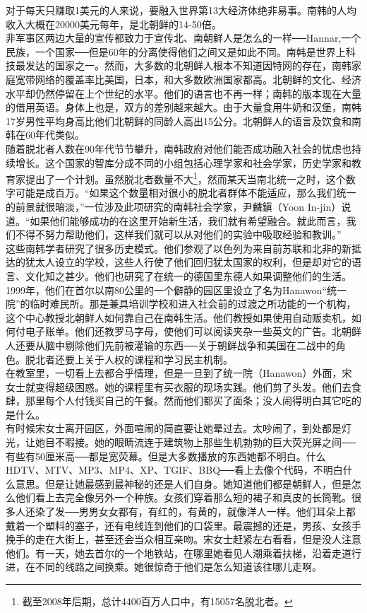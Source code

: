 对于每天只赚取1美元的人来说，要融入世界第13大经济体绝非易事。南韩的人均收入大概在20000美元每年，是北朝鲜的14-50倍。\\

非军事区两边大量的宣传都致力于宣传北、南朝鲜人是怎么的一样──Hannar,一个民族，一个国家──但是60年的分离使得他们之间又是如此不同。南韩是世界上科技最发达的国家之一。然而，大多数的北朝鲜人根本不知道因特网的存在，南韩家庭宽带网络的覆盖率比美国，日本，和大多数欧洲国家都高。北朝鲜的文化、经济水平却仍然停留在上个世纪的水平。他们的语言也不再一样；南韩的版本现在大量的借用英语。身体上也是，双方的差别越来越大。由于大量食用牛奶和汉堡，南韩17岁男性平均身高比他们北朝鲜的同龄人高出15公分。北朝鲜人的语言及饮食和南韩在60年代类似。\\

随着脱北者人数在90年代节节攀升，南韩政府对他们能否成功融入社会的忧虑也持续增长。这个国家的智库分成不同的小组包括心理学家和社会学家，历史学家和教育家提出了一个计划。虽然脱北者数量不大\footnote{截至2008年后期，总计4400百万人口中，有15057名脱北者。}，然而某天当南北统一之时，这个数字可能是成百万。“如果这个数量相对很小的脱北者群体不能适应，那么我们统一的前景就很暗淡，”一位涉及此项研究的南韩社会学家，尹麟鎭（Yoon In-jin）说道。“如果他们能够成功的在这里开始新生活，我们就有希望融合。就此而言，我们不得不努力帮助他们，这样我们就可以从对他们的实验中吸取经验和教训。”\\

这些南韩学者研究了很多历史模式。他们参观了以色列为来自前苏联和北非的新抵达的犹太人设立的学校，这些人行使了他们回归犹太国家的权利，但是却对它的语言、文化知之甚少。他们也研究了在统一的德国里东德人如果调整他们的生活。\\

1999年，他们在首尔以南80公里的一个僻静的园区里设立了名为Hanawon“统一院”的临时难民所。那是兼具培训学校和进入社会前的过渡之所功能的一个机构，这个中心教授北朝鲜人如何靠自己在南韩生活。他们教授如果使用自动贩卖机，如何付电子账单。他们还教罗马字母，使他们可以阅读夹杂一些英文的广告。北朝鲜人还要从脑中剔除他们先前被灌输的东西──关于朝鲜战争和美国在二战中的角色。脱北者还要上关于人权的课程和学习民主机制。\\

在教室里，一切看上去都合乎情理，但是一旦到了统一院（Hanawon）外面，宋女士就变得超级困惑。她的课程里有买衣服的现场实践。他们剪了头发。他们去食肆，那里每个人付钱买自己的午餐。然而他们都买了面条；没人闹得明白其它吃的是什么。\\

有时候宋女士离开园区，外面喧闹的简直要让她晕过去。太吵闹了，到处都是灯光，让她目不暇接。她的眼睛流连于建筑物上那些生机勃勃的巨大荧光屏之间──有些有50厘米高──都是宽荧幕。但是大多数播放的东西她都不明白。什么HDTV、MTV、MP3、MP4、XP、TGIF、BBQ──看上去像个代码，不明白什么意思。但是让她最感到最神秘的还是人们自身。她知道他们都是朝鲜人，但是怎么他们看上去完全像另外一个种族。女孩们穿着那么短的裙子和真皮的长筒靴。很多人还染了发──男男女女都有，有红的，有黄的，就像洋人一样。他们耳朵上都戴着一个塑料的塞子，还有电线连到他们的口袋里。最震撼的还是，男孩、女孩手挽手的走在大街上，甚至还会当众相互亲吻。宋女士赶紧左右看看，但是没人注意他们。有一天，她去首尔的一个地铁站，在哪里她看见人潮乘着扶梯，沿着走道行进，在不同的线路之间换乘。她很惊奇于他们是怎么知道该往哪儿走啊。\\

